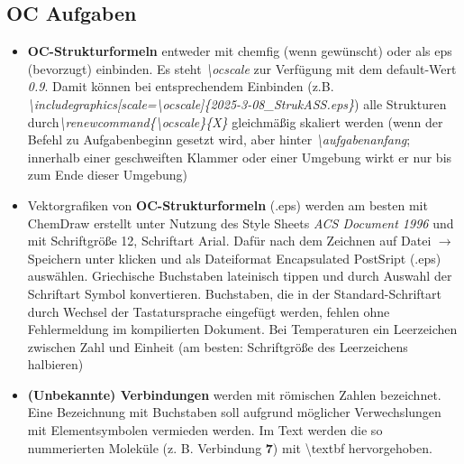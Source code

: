 \documentclass[./main.tex]{subfiles}
\begin{document}
\subsection{OC Aufgaben}
\begin{itemize}
    \item \textbf{OC-Strukturformeln} entweder mit chemfig (wenn gewünscht) oder als eps (bevorzugt) einbinden. Es steht \textit{\textbackslash ocscale} zur Verf\"ugung mit dem default-Wert \textit{0.9}. Damit k\"onnen bei entsprechendem Einbinden (z.B. \linebreak\textit{\textbackslash includegraphics[scale=\textbackslash ocscale]\{2025-3-08\_StrukASS.eps\}}) alle Strukturen durch\linebreak \textit{\textbackslash renewcommand\{\textbackslash ocscale\}\{X\}} gleichm\"a\ss{}ig skaliert werden (wenn der Befehl zu Aufgabenbeginn gesetzt wird, aber hinter \textit{\textbackslash aufgabenanfang}; innerhalb einer geschweiften Klammer oder einer Umgebung wirkt er nur bis zum Ende dieser Umgebung)
    \item Vektorgrafiken von \textbf{OC-Strukturformeln} (.eps) werden am besten mit ChemDraw erstellt unter Nutzung des Style Sheets \textit{ACS Document 1996} und mit Schriftgr\"o\ss{}e 12, Schriftart Arial. Dafür nach dem Zeichnen auf \glqq Datei\grqq{} $\rightarrow$ \glqq Speichern unter\grqq{} klicken und als Dateiformat  \glqq Encapsulated PostSript\grqq{} (.eps) auswählen. Griechische Buchstaben lateinisch tippen und durch Auswahl der Schriftart \glqq Symbol\grqq{} konvertieren. Buchstaben, die in der Standard-Schriftart durch Wechsel der Tastatursprache eingef\"ugt werden, fehlen ohne Fehlermeldung im kompilierten Dokument. Bei Temperaturen ein Leerzeichen zwischen Zahl und Einheit (am besten: Schriftgr\"o\ss{}e des Leerzeichens halbieren)
    \item \textbf{(Unbekannte) Verbindungen} werden mit römischen Zahlen bezeichnet. Eine Bezeichnung mit Buchstaben soll aufgrund möglicher Verwechslungen mit Elementsymbolen vermieden werden. Im Text werden die so nummerierten Moleküle (z. B. Verbindung \textbf{7}) mit \textbackslash textbf hervorgehoben.

\end{itemize}
\end{document}
